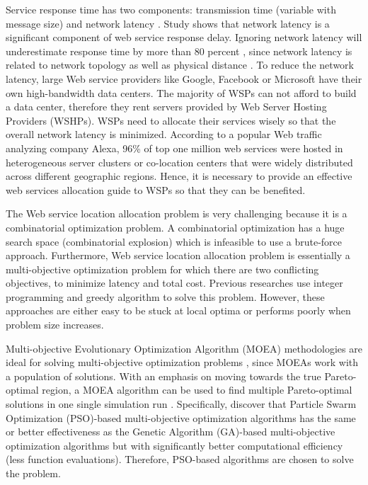 Service response time has two components: transmission time (variable with message size) and network latency \cite{Johansson}. 
Study \cite{916684} shows that network latency is a significant component of web service response delay.
Ignoring network latency will underestimate response time by more than 80 percent \cite{Sun}, since network latency is related to network topology as well as physical distance \cite{distanceMetrics}. 
To reduce the network latency, large Web service providers like Google, Facebook or Microsoft have their own high-bandwidth data centers. The majority of WSPs
can not afford to build a data center, therefore they rent servers provided by Web Server Hosting Providers (WSHPs). WSPs need to allocate their services wisely so that the overall network latency is minimized. 
According to a popular Web traffic analyzing company Alexa, 96\% of top one million web services were hosted
in heterogeneous server clusters or co-location centers \cite{He} that were widely distributed across different geographic regions. 
Hence, it is necessary to provide an effective web services allocation guide to WSPs so that they can be benefited.


The Web service location allocation problem is very challenging because it is a combinatorial optimization problem. A combinatorial optimization has 
a huge search space (combinatorial explosion) which is infeasible to use a brute-force approach. Furthermore, Web service location allocation problem is
essentially a multi-objective optimization problem \cite{Multiobjective} for which there are two conflicting objectives, to minimize latency and total cost.
Previous researches \cite{Aboolian, Sun} use integer programming and greedy algorithm to solve this problem. However, these approaches are either easy to be stuck at 
local optima or performs poorly when problem size increases.

Multi-objective Evolutionary Optimization Algorithm (MOEA) methodologies are ideal for solving multi-objective optimization problems \cite{key:article}, 
since MOEAs work with a population of solutions.
With an emphasis on moving towards the true Pareto-optimal region, a MOEA algorithm can be used to find multiple Pareto-optimal solutions in 
one single simulation run \cite{OptimizationElectrical}. 
Specifically, \cite{godinez2010,hassan2005} discover that Particle Swarm Optimization (PSO)-based multi-objective optimization algorithms has the same or better effectiveness as 
the Genetic Algorithm (GA)-based multi-objective optimization algorithms but with significantly better computational efficiency (less function evaluations). 
Therefore, PSO-based algorithms are chosen to solve the problem.


